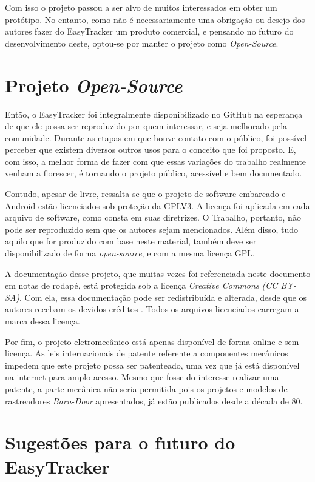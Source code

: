 Com isso o projeto passou a ser alvo de muitos interessados em obter um protótipo. No entanto, como não é necessariamente uma obrigação ou desejo dos autores fazer do EasyTracker um produto comercial, e pensando no futuro do desenvolvimento deste, optou-se por manter o projeto como \textit{Open-Source}.

\section{Projeto \textit{Open-Source}}

Então, o EasyTracker foi integralmente disponibilizado no GitHub na esperança de que ele possa ser reproduzido por quem interessar, e seja melhorado pela comunidade. Durante as etapas em que houve contato com o público, foi possível perceber que existem diversos outros usos para o conceito que foi proposto. E, com isso, a melhor forma de fazer com que essas variações do trabalho realmente venham a florescer, é tornando o projeto público, acessível e bem documentado.

Contudo, apesar de livre, ressalta-se que o projeto de software embarcado e Android estão licenciados sob proteção da GPLV3. A licença foi aplicada em cada arquivo de software, como consta em suas diretrizes. O Trabalho, portanto, não pode ser reproduzido sem que os autores sejam mencionados. Além disso, tudo aquilo que for produzido com base neste material, também deve ser disponibilizado de forma \textit{open-source}, e com a mesma licença GPL. 

A documentação desse projeto, que muitas vezes foi referenciada neste documento em notas de rodapé, está protegida sob a licença \textit{Creative Commons (CC BY-SA)}. Com ela, essa documentação pode ser redistribuída e alterada, desde que os autores recebam os devidos créditos \cite{CCBYSA}. Todos os arquivos licenciados carregam a marca dessa licença. 


Por fim, o projeto eletromecânico está apenas disponível de forma online e sem licença. As leis internacionais de patente referente a componentes mecânicos impedem que este projeto possa ser patenteado, uma vez que já está disponível na internet para amplo acesso. Mesmo que fosse do interesse realizar uma patente, a parte mecânica não seria permitida pois os projetos e modelos de rastreadores \textit{Barn-Door} apresentados, já estão publicados desde a década de 80.


\section{Sugestões para o futuro do EasyTracker}


